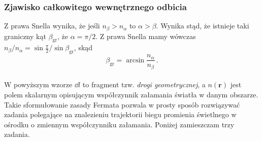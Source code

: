 \documentclass[../main.tex]{subfiles}
\begin{document}
\subsubsection*{Zjawisko całkowitego wewnętrznego odbicia}
 Z prawa Snella wynika, że jeśli \(n_\beta>n_\alpha\) to \(\alpha>\beta\). Wynika stąd, że istnieje taki graniczny kąt \(\beta_\text{gr}\), że \(\alpha=\pi/2\). Z prawa Snella mamy wówczas \(n_\beta/n_\alpha=\sin \frac{\pi}{2}/\sin\beta_\text{gr}\), skąd
\begin{equation*}
    \beta_\text{gr}=\arcsin\frac{n_\alpha}{n_\beta}\,.
\end{equation*}
\noindent{}\\

W powyższym wzorze \(\dd{l}\) to fragment tzw. \textit{drogi geometrycznej}, a \(n(\mathbf{r})\) jest polem skalarnym opisującym współczynnik załamania światła w danym obszarze. Takie sformułowanie zasady Fermata pozwala w prosty sposób rozwiązywać zadania polegające na znalezieniu trajektorii biegu promienia świetlnego w ośrodku o zmiennym współczynniku załamania. Poniżej zamieszczam trzy zadania.
\medskip
\end{document}
